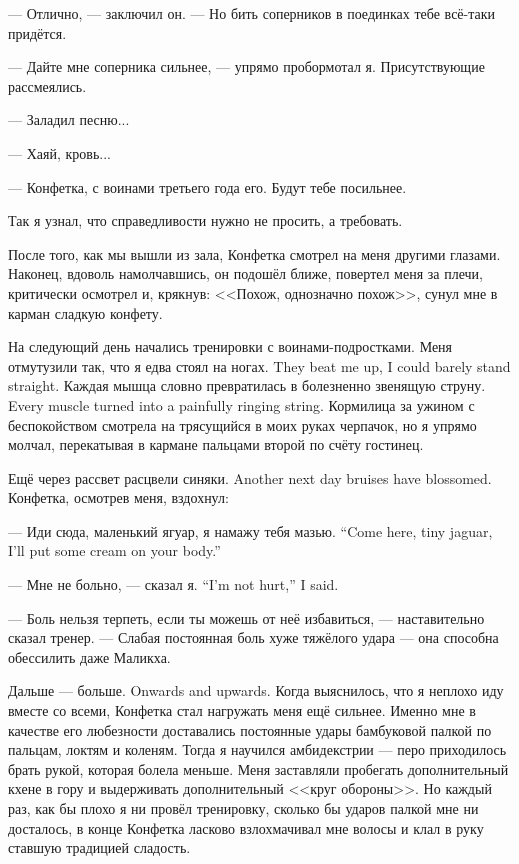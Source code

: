 --- Отлично, --- заключил он.
--- Но бить соперников в поединках тебе всё-таки придётся.

--- Дайте мне соперника сильнее, --- упрямо пробормотал я.
Присутствующие рассмеялись.

--- Заладил песню...

--- Хаяй, кровь...

--- Конфетка, с воинами третьего года его.
Будут тебе посильнее.

Так я узнал, что справедливости нужно не просить, а требовать.

\asterism

После того, как мы вышли из зала, Конфетка смотрел на меня другими глазами.
Наконец, вдоволь намолчавшись, он подошёл ближе, повертел меня за плечи, критически осмотрел и, крякнув: <<Похож, однозначно похож>>, сунул мне в карман сладкую конфету.

На следующий день начались тренировки с воинами-подростками.
{Меня отмутузили так, что я едва стоял на ногах.}
{They beat me up, I could barely stand straight.}
{Каждая мышца словно превратилась в болезненно звенящую струну.}
{Every muscle turned into a painfully ringing string.}
Кормилица за ужином с беспокойством смотрела на трясущийся в моих руках черпачок, но я упрямо молчал, перекатывая в кармане пальцами второй по счёту гостинец.

{Ещё через рассвет расцвели синяки.}
{Another next day bruises have blossomed.}
Конфетка, осмотрев меня, вздохнул:

{--- Иди сюда, маленький ягуар, я намажу тебя мазью.}
{``Come here, tiny jaguar, I'll put some cream on your body.''}

{--- Мне не больно, --- сказал я.}
{``I'm not hurt,'' I said.}

--- Боль нельзя терпеть, если ты можешь от неё избавиться, --- наставительно сказал тренер.
--- Слабая постоянная боль хуже тяжёлого удара --- она способна обессилить даже Маликха.

{Дальше --- больше.}
{Onwards and upwards.}
Когда выяснилось, что я неплохо иду вместе со всеми, Конфетка стал нагружать меня ещё сильнее.
Именно мне в качестве его любезности доставались постоянные удары бамбуковой палкой по пальцам, локтям и коленям.
Тогда я научился амбидекстрии --- перо приходилось брать рукой, которая болела меньше.
Меня заставляли пробегать дополнительный кхене в гору и выдерживать дополнительный <<круг обороны>>.
Но каждый раз, как бы плохо я ни провёл тренировку, сколько бы ударов палкой мне ни досталось, в конце Конфетка ласково взлохмачивал мне волосы и клал в руку ставшую традицией сладость.


